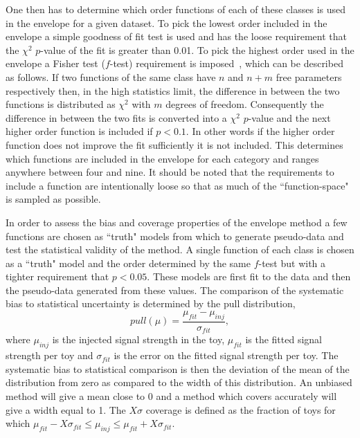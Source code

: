 One then has to determine which order functions of each of these classes is used in the envelope for a given dataset. To pick the lowest order included in the envelope a simple goodness of fit test is used and has the loose requirement that the $\chi^{2}$ $p$-value of the fit is greater than 0.01. To pick the highest order used in the envelope a Fisher test ($f$-test) requirement is imposed~\cite{fisher}, which can be described as follows. If two functions of the same class have $n$ and $n+m$ free parameters respectively then, in the high statistics limit, the difference in \NLL between the two functions is distributed as $\chi^{2}$ with $m$ degrees of freedom. Consequently the difference in \NLL between the two fits is converted into a $\chi^{2}$ $p$-value and the next higher order function is included if $p<0.1$. In other words if the higher order function does not improve the fit sufficiently it is not included. This determines which functions are included in the envelope for each category and ranges anywhere between four and nine. It should be noted that the requirements to include a function are intentionally loose so that as much of the ``function-space" is sampled as possible.

In order to assess the bias and coverage properties of the envelope method a few functions are chosen as ``truth" models from which to generate pseudo-data and test the statistical validity of the method. A single function of each class is chosen as a ``truth" model and the order determined by the same $f$-test but with a tighter requirement that $p<0.05$. These models are first fit to the data and then the pseudo-data generated from these values. The comparison of the systematic bias to statistical uncertainty is determined by the pull distribution,
\begin{equation}
  pull(\mu) = \frac{\mu_{fit} - \mu_{inj}}{\sigma_{fit}},
\end{equation}
where $\mu_{inj}$ is the injected signal strength in the toy, $\mu_{fit}$ is the fitted signal strength per toy and $\sigma_{fit}$ is the error on the fitted signal strength per toy. The systematic bias to statistical comparison is then the deviation of the mean of the distribution from zero as compared to the width of this distribution. An unbiased method will give a mean close to 0 and a method which covers accurately will give a width equal to 1. The $X\sigma$ coverage is defined as the fraction of toys for which $\mu_{fit}-X\sigma_{fit}\leq\mu_{inj}\leq\mu_{fit}+X\sigma_{fit}$.

